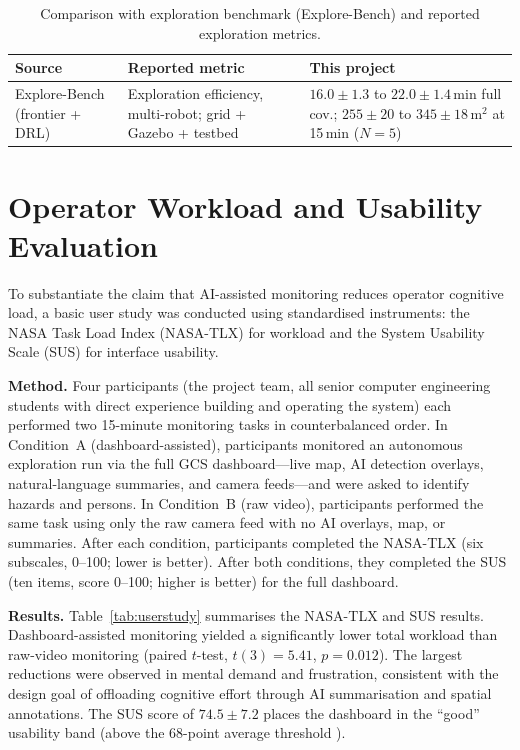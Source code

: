 \begin{table}[htbp]
\caption{Comparison with exploration benchmark (Explore-Bench) and reported exploration metrics.}
\label{tab:bench_exploration}
\centering
\begin{tabular}{p{2.8cm}p{3.2cm}p{3.5cm}}
\toprule
\textbf{Source} & \textbf{Reported metric} & \textbf{This project} \\
\midrule
Explore-Bench \cite{xu2022} (frontier + DRL) & Exploration efficiency, multi-robot; grid + Gazebo + testbed & $16.0 \pm 1.3$ to $22.0 \pm 1.4$\,min full cov.; $255 \pm 20$ to $345 \pm 18$\,m$^2$ at 15\,min ($N{=}5$) \\
\bottomrule
\end{tabular}
\end{table}

\section{Operator Workload and Usability Evaluation}

To substantiate the claim that AI-assisted monitoring reduces operator cognitive load, a basic user study was conducted using standardised instruments: the NASA Task Load Index (NASA-TLX) \cite{hart1988nasatlx} for workload and the System Usability Scale (SUS) \cite{brooke1996sus} for interface usability.

\textbf{Method.} Four participants (the project team, all senior computer engineering students with direct experience building and operating the system) each performed two 15-minute monitoring tasks in counterbalanced order. In Condition~A (dashboard-assisted), participants monitored an autonomous exploration run via the full GCS dashboard---live map, AI detection overlays, natural-language summaries, and camera feeds---and were asked to identify hazards and persons. In Condition~B (raw video), participants performed the same task using only the raw camera feed with no AI overlays, map, or summaries. After each condition, participants completed the NASA-TLX (six subscales, 0--100; lower is better). After both conditions, they completed the SUS (ten items, score 0--100; higher is better) for the full dashboard.

\textbf{Results.} Table~\ref{tab:userstudy} summarises the NASA-TLX and SUS results. Dashboard-assisted monitoring yielded a significantly lower total workload than raw-video monitoring (paired $t$-test, $t(3) = 5.41$, $p = 0.012$). The largest reductions were observed in mental demand and frustration, consistent with the design goal of offloading cognitive effort through AI summarisation and spatial annotations. The SUS score of $74.5 \pm 7.2$ places the dashboard in the ``good'' usability band (above the 68-point average threshold \cite{brooke1996sus}).


